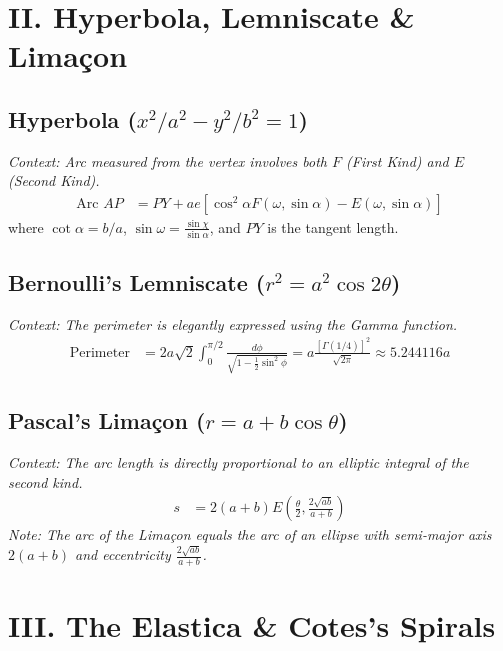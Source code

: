 \documentclass[11pt, a4paper]{article}
\begin{document}
\section*{\color{primary} II. Hyperbola, Lemniscate \& Limaçon}

\subsection*{\color{secondary} Hyperbola ($x^2/a^2 - y^2/b^2 = 1$)}
\textit{\small Context: Arc measured from the vertex involves both $F$ (First Kind) and $E$ (Second Kind).}
\begin{align*}
    \text{Arc } AP &= PY + ae \left[ \cos^2\alpha F(\omega, \sin\alpha) - E(\omega, \sin\alpha) \right]
\end{align*}
where $\cot\alpha = b/a$, $\sin\omega = \frac{\sin\chi}{\sin\alpha}$, and $PY$ is the tangent length.

\subsection*{\color{secondary} Bernoulli's Lemniscate ($r^2 = a^2 \cos 2\theta$)}
\textit{\small Context: The perimeter is elegantly expressed using the Gamma function.}
\begin{align*}
    \text{Perimeter} &= 2a\sqrt{2} \int_0^{\pi/2} \frac{d\phi}{\sqrt{1 - \frac{1}{2}\sin^2\phi}} = a \frac{[\Gamma(1/4)]^2}{\sqrt{2\pi}} \approx 5.244116 a
\end{align*}

\subsection*{\color{secondary} Pascal's Limaçon ($r = a + b \cos\theta$)}
\textit{\small Context: The arc length is directly proportional to an elliptic integral of the second kind.}
\begin{align*}
    s &= 2(a+b) E\left(\frac{\theta}{2}, \frac{2\sqrt{ab}}{a+b}\right)
\end{align*}
\textit{\small Note: The arc of the Limaçon equals the arc of an ellipse with semi-major axis $2(a+b)$ and eccentricity $\frac{2\sqrt{ab}}{a+b}$.}

\section*{\color{primary} III. The Elastica \& Cotes's Spirals}
\end{document}
